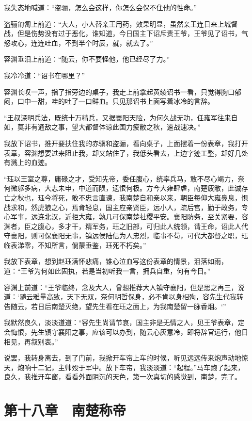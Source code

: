 我失态地喊道：“盗骊，怎么会这样，你怎么会保不住他的性命。”

盗骊匍匐上前道：“大人，小人替亲王用药，效果明显，虽然亲王连日来上城督战，但是伤势没有过于恶化，谁知道，今日国主下诏斥责王爷，王爷见了诏书，气怒攻心，连连吐血，不到半个时辰，就，就去了。”

容渊垂泪上前道：“随云，你不要怪他，他已经尽了力。”

我冷冷道：“诏书在哪里？”

容渊长叹一声，指了指旁边的桌子，我走上前拿起黄绫诏书一看，只觉得胸口郁闷，口中一甜，哇的吐了一口鲜血。只见那诏书上面写着冰冷的言辞。

“王叔深明兵法，既统十万精兵，又据襄阳天险，为何久战无功，任雍军往来自如，莫非有通敌之事，望大都督体谅此国力疲敝之秋，速战速决。”

我放下诏书，推开要扶住我的赤骥和盗骊，看向桌子，上面摆着一份表章，我打开表章，容渊想要过来阻止我，却又站住了，我低头看去，上边字迹工整，却好几处有溅上的血迹。

“珏以王室之尊，庸碌之才，受知先帝，委任腹心，统率兵马，敢不尽心竭力，奈何微躯多病，大志未申，中道而陨，遗恨何极。方今大雍肆虐，南楚疲敝，此诚存亡之秋也，珏今将死，敢不忠言直谏，我南楚自和亲以来，朝臣每仰大雍鼻息，惧战求和，然虎狼之心，焉肯轻息，国主应亲贤臣，远小人，疏后宫，勤于政务，专心军事，远连北汉，近拒大雍，孰几可保南楚社稷平安。襄阳防务，至关紧要，容渊者，臣之腹心，多才干，精军务，珏之旧部，可归此人统领，请王命，诏此人代守襄阳，则可保襄阳无事，镇远侯陆信为人忠烈，临事不苟，可代大都督之职，珏临表涕零，不知所言，倘蒙垂鉴，珏死不朽矣。”

我放下表章，想到赵珏满怀悲痛，锥心泣血写这份表章的情景，泪落如雨，道：“王爷为何如此固执，若是当初听我一言，拥兵自重，何有今日。”

容渊上前道：“王爷临终，念及大人，曾想推荐大人镇守襄阳，但是思之再三，说道：‘随云雅量高致，天下无双，奈何明哲保身，必不肯以身相殉，容先生代我转告随云，若日后南楚灭绝，望先生看在珏之面上，为我南楚留一脉香烟。‘”

我默然良久，淡淡道道：“容先生尚请节哀，国主非是无情之人，见王爷表章，定会悔恨，先生镇守襄阳之事，应该可以办到，随云心灰意冷，即将辞官远行，他日相见，再叙别衷。”

说罢，我转身离去，到了门前，我掀开车帘上车的时候，听见远远传来炮声动地惊天，炮响十二记，主帅殁于军中。放下车帘，我淡淡道：“起程。”马车跑了起来，良久，我推开车窗，看看外面阴沉的天色，第一次真切的感觉到，南楚，完了。

\chapter{第十八章　南楚称帝}

